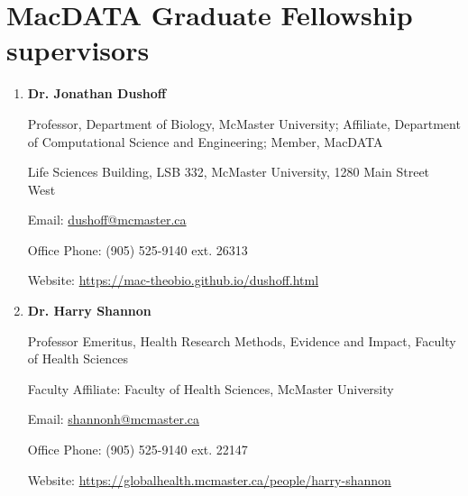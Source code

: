 \documentclass[12pt]{article}
\begin{document}
\section*{MacDATA Graduate Fellowship supervisors}

\begin{enumerate}

\item \textbf{Dr. Jonathan Dushoff}

Professor, Department of Biology, McMaster University; Affiliate,  Department of Computational Science and Engineering; Member, MacDATA

Life Sciences Building, LSB 332, McMaster University, 1280 Main Street West

Email: \url{dushoff@mcmaster.ca}

Office Phone: (905) 525-9140 ext. 26313

Website: \url{https://mac-theobio.github.io/dushoff.html}

\item \textbf{Dr. Harry Shannon}

Professor Emeritus, Health Research Methods, Evidence and Impact, Faculty of Health Sciences

Faculty Affiliate: Faculty of Health Sciences, McMaster University

Email: \url{shannonh@mcmaster.ca}

Office Phone: (905) 525-9140 ext. 22147

Website: \url{https://globalhealth.mcmaster.ca/people/harry-shannon}

\end{enumerate}
\end{document}
